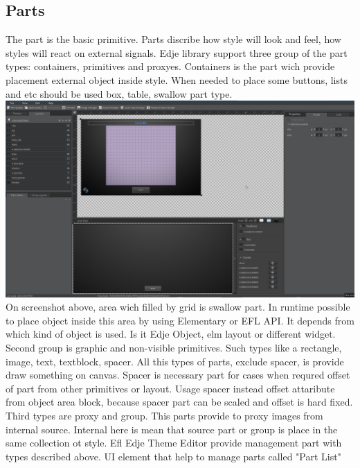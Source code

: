 \documentclass[titlepage,oneside,11pt]{book}
\begin{document}
\subsection{Parts}
The part is the basic primitive. Parts discribe how style will look and feel, how styles will react on external signals.\newline %
Edje library support three group of the part types: containers, primitives and proxyes.
Containers is the part wich provide placement external object inside style. When needed to place some buttons, lists and etc should be used box, table, swallow part type.\newline
\includegraphics[scale=0.2]{images/container_example.jpg}\newline %
On screenshot above, area wich filled by grid is swallow part. In runtime possible to place object inside this area by using Elementary or EFL API. It depends from which kind of object is used. Is it Edje Object, elm layout or different widget.\newline
Second group is graphic and non-visible primitives. Such types like a rectangle, image, text, textblock, spacer. All this types of parts, exclude spacer, is provide draw something on canvas. Spacer is necessary part for cases when requred offset of part from other primitives or layout. Usage spacer instead offset attaribute from object area block, because spacer part can be scaled and offset is hard fixed.\newline
Third types are proxy and group. This parts provide to proxy images from internal source. Internal here is mean that source part or group is place in the same collection ot style.\newline
Efl Edje Theme Editor provide management part with types described above. UI element that help to manage parts called "{}Part List"{}\newline
\end{document}
